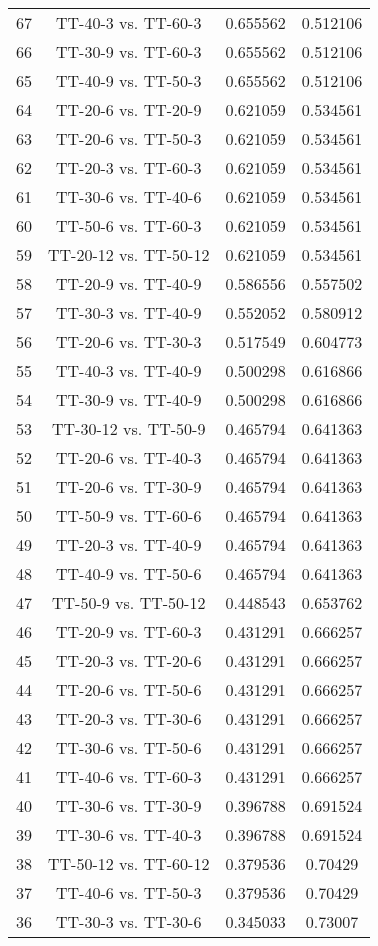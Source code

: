 \documentclass[a4paper,10pt]{article}
\begin{document}
\begin{landscape}
\begin{table}[!htp]
\begin{tabular}{cccc}
67&TT-40-3 vs. TT-60-3&0.655562&0.512106\\
66&TT-30-9 vs. TT-60-3&0.655562&0.512106\\
65&TT-40-9 vs. TT-50-3&0.655562&0.512106\\
64&TT-20-6 vs. TT-20-9&0.621059&0.534561\\
63&TT-20-6 vs. TT-50-3&0.621059&0.534561\\
62&TT-20-3 vs. TT-60-3&0.621059&0.534561\\
61&TT-30-6 vs. TT-40-6&0.621059&0.534561\\
60&TT-50-6 vs. TT-60-3&0.621059&0.534561\\
59&TT-20-12 vs. TT-50-12&0.621059&0.534561\\
58&TT-20-9 vs. TT-40-9&0.586556&0.557502\\
57&TT-30-3 vs. TT-40-9&0.552052&0.580912\\
56&TT-20-6 vs. TT-30-3&0.517549&0.604773\\
55&TT-40-3 vs. TT-40-9&0.500298&0.616866\\
54&TT-30-9 vs. TT-40-9&0.500298&0.616866\\
53&TT-30-12 vs. TT-50-9&0.465794&0.641363\\
52&TT-20-6 vs. TT-40-3&0.465794&0.641363\\
51&TT-20-6 vs. TT-30-9&0.465794&0.641363\\
50&TT-50-9 vs. TT-60-6&0.465794&0.641363\\
49&TT-20-3 vs. TT-40-9&0.465794&0.641363\\
48&TT-40-9 vs. TT-50-6&0.465794&0.641363\\
47&TT-50-9 vs. TT-50-12&0.448543&0.653762\\
46&TT-20-9 vs. TT-60-3&0.431291&0.666257\\
45&TT-20-3 vs. TT-20-6&0.431291&0.666257\\
44&TT-20-6 vs. TT-50-6&0.431291&0.666257\\
43&TT-20-3 vs. TT-30-6&0.431291&0.666257\\
42&TT-30-6 vs. TT-50-6&0.431291&0.666257\\
41&TT-40-6 vs. TT-60-3&0.431291&0.666257\\
40&TT-30-6 vs. TT-30-9&0.396788&0.691524\\
39&TT-30-6 vs. TT-40-3&0.396788&0.691524\\
38&TT-50-12 vs. TT-60-12&0.379536&0.70429\\
37&TT-40-6 vs. TT-50-3&0.379536&0.70429\\
36&TT-30-3 vs. TT-30-6&0.345033&0.73007\\

\end{tabular}
\end{table}
\end{landscape}
\end{document}
